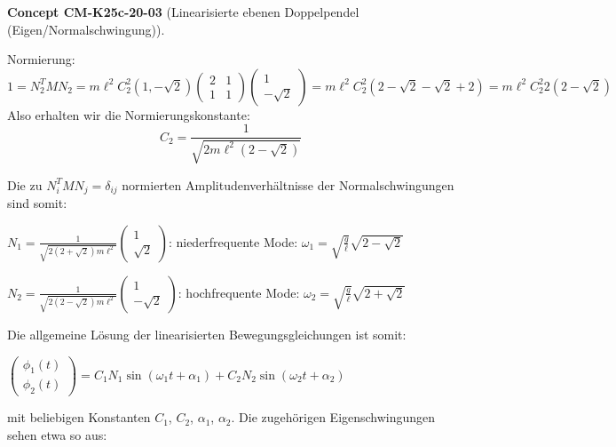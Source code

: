 \documentclass[10pt, letterpaper]{article}
\newcommand{\CustomHeading}[3]{%
  \par\medskip\noindent%
  \textbf{#1 #2} \textnormal{(#3)}.\enskip%
}
\newenvironment{CONC}[2]{\CustomHeading{Concept}{#1}{#2}}{}
\begin{document}
\begin{CONC}{CM-K25c-20-03}{Linearisierte ebenen Doppelpendel (Eigen/Normalschwingung)}
Normierung:
$$1 = N_2^T M N_2 = m\ell^2 C_2^2(1,-\sqrt{2})\begin{pmatrix}2 & 1 \\ 1 & 1\end{pmatrix}\begin{pmatrix}1 \\ -\sqrt{2}\end{pmatrix} = m\ell^2 C_2^2(2-\sqrt{2}-\sqrt{2}+2) = m\ell^2 C_2^2 2(2-\sqrt{2})$$
Also erhalten wir die Normierungskonstante:
$$C_2 = \frac{1}{\sqrt{2m\ell^2(2-\sqrt{2})}}$$

Die zu $N_i^T M N_j = \delta_{ij}$ normierten Amplitudenverhältnisse der Normalschwingungen sind somit:

\begin{center}
$N_1 = \frac{1}{\sqrt{2(2+\sqrt{2})m\ell^2}}\begin{pmatrix}1 \\ \sqrt{2}\end{pmatrix}$: niederfrequente Mode: $\omega_1 = \sqrt{\frac{g}{\ell}}\sqrt{2-\sqrt{2}}$

$N_2 = \frac{1}{\sqrt{2(2-\sqrt{2})m\ell^2}}\begin{pmatrix}1 \\ -\sqrt{2}\end{pmatrix}$: hochfrequente Mode: $\omega_2 = \sqrt{\frac{g}{\ell}}\sqrt{2+\sqrt{2}}$
\end{center}

Die allgemeine Lösung der linearisierten Bewegungsgleichungen ist somit:

$\begin{pmatrix}\phi_1(t) \\ \phi_2(t)\end{pmatrix} = C_1 N_1 \sin(\omega_1t + \alpha_1) + C_2 N_2 \sin(\omega_2t + \alpha_2)$

mit beliebigen Konstanten $C_1$, $C_2$, $\alpha_1$, $\alpha_2$.
Die zugehörigen Eigenschwingungen sehen etwa so aus:

\begin{center}
\end{center}
\end{CONC}
\end{document}
